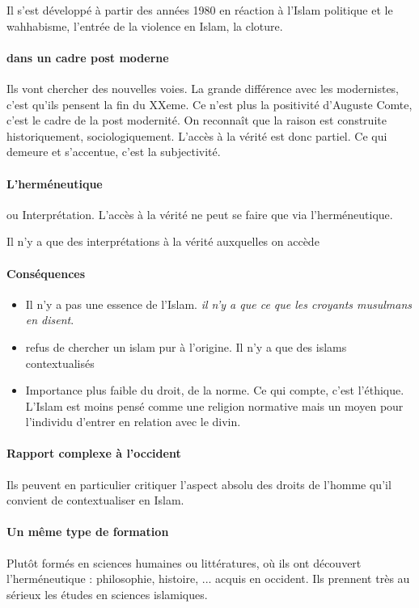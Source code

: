 Il s'est développé à partir des années 1980 en réaction à l'Islam politique et le wahhabisme, l'entrée de la violence en Islam, la cloture.

\paragraph{dans un cadre post moderne}
Ils vont chercher des nouvelles voies. La grande différence avec les modernistes, c'est qu'ils pensent la fin du XXeme. Ce n'est plus la positivité d'Auguste Comte, c'est le cadre de la post modernité. On reconnaît que la raison est construite historiquement, sociologiquement. L'accès à la vérité est donc partiel. Ce qui demeure et s'accentue, c'est la subjectivité.

\paragraph{L'herméneutique} ou Interprétation. L'accès à la vérité ne peut se faire que via l'herméneutique.

\begin{Def}[herméneutique]
Il n'y a que des interprétations à la vérité auxquelles on accède
\end{Def}

\paragraph{Conséquences} 
\begin{itemize}
    \item Il n'y a pas une essence de l'Islam. \textit{il n'y a que ce que les croyants musulmans en disent}.
    \item refus de chercher un islam pur à l'origine. Il n'y a que des islams contextualisés
    \item Importance plus faible du droit, de la norme. Ce qui compte, c'est l'éthique. L'Islam est moins pensé comme une religion normative mais un moyen pour l'individu d'entrer en relation avec le divin.
\end{itemize}

\paragraph{Rapport complexe à l'occident} Ils peuvent en particulier critiquer l'aspect absolu des droits de l'homme qu'il convient de contextualiser en Islam.

\paragraph{Un même type de formation} Plutôt formés en sciences humaines ou littératures, où ils ont découvert l'herméneutique : philosophie, histoire, ... acquis en occident. Ils prennent très au sérieux les études en sciences islamiques. 

